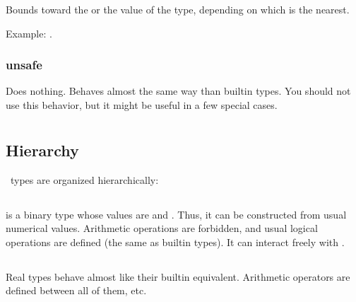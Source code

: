 Bounds toward the  or the  value of the type,
depending on which is the nearest.

Example: .

\subsubsection{unsafe}

Does nothing. Behaves almost the same way than builtin types. You
should not use this behavior, but it might be useful in a few special
cases.




\section{}

\subsection{Hierarchy}

\integre\ types are organized hierarchically:


\subsection{}

 is a binary type whose values are  and .
Thus, it can be constructed from usual numerical values.  Arithmetic
operations are forbidden, and usual logical operations are defined
(the same as builtin types).  It can interact freely with .

\subsection{}

Real types behave almost like their builtin equivalent.  Arithmetic
operators are defined between all of them, etc.  

